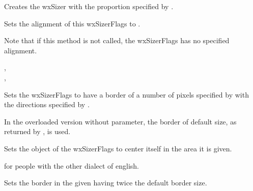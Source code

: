 
Creates the wxSizer with the proportion specified by .


\label{wxsizerflagsalign}


Sets the alignment of this wxSizerFlags to .

Note that if this method is not called, the wxSizerFlags has no specified alignment.


,\\
,\\


\label{wxsizerflagsborder}



Sets the wxSizerFlags to have a border of a number of pixels specified by
 with the directions specified by .

In the overloaded version without  parameter, the border of
default size, as returned by ,
is used.


\label{wxsizerflagscenter}


Sets the object of the wxSizerFlags to center itself in the area it is given.


\label{wxsizerflagscentre}


 for people with the other dialect of english.


\label{wxsizerflagsdoubleborder}


Sets the border in the given  having twice the default border
size.


